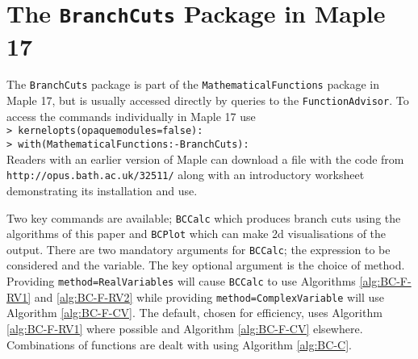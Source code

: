 \documentclass{llncs}
\begin{document}
\appendix

\section{The \texttt{BranchCuts} Package in {\sc Maple 17}} \label{APP:Maple}

The \texttt{BranchCuts} package is part of the \texttt{MathematicalFunctions} package in {\sc Maple 17}, but is usually accessed directly by queries to the \texttt{FunctionAdvisor}.  To access the commands individually in Maple 17 use \\
\texttt{> kernelopts(opaquemodules=false):} \\ 
\texttt{> with(MathematicalFunctions:-BranchCuts):} \\
Readers with an earlier version of {\sc Maple} can download a file with the code from \texttt{http://opus.bath.ac.uk/32511/} along with an introductory  worksheet demonstrating its installation and use. 

Two key commands are available; \texttt{BCCalc} which produces branch cuts using the algorithms of this paper and \texttt{BCPlot} which can make 2d visualisations of the output.  There are two mandatory arguments for \texttt{BCCalc}; the expression to be considered and the variable.  The key optional argument is the choice of method.  Providing \texttt{method=RealVariables} will cause \texttt{BCCalc} to use Algorithms \ref{alg:BC-F-RV1} and \ref{alg:BC-F-RV2} while providing \texttt{method=ComplexVariable} will use Algorithm \ref{alg:BC-F-CV}.  The default, chosen for efficiency, uses Algorithm \ref{alg:BC-F-RV1} where possible and Algorithm \ref{alg:BC-F-CV} elsewhere.  Combinations of functions are dealt with using Algorithm \ref{alg:BC-C}.
\end{document}
